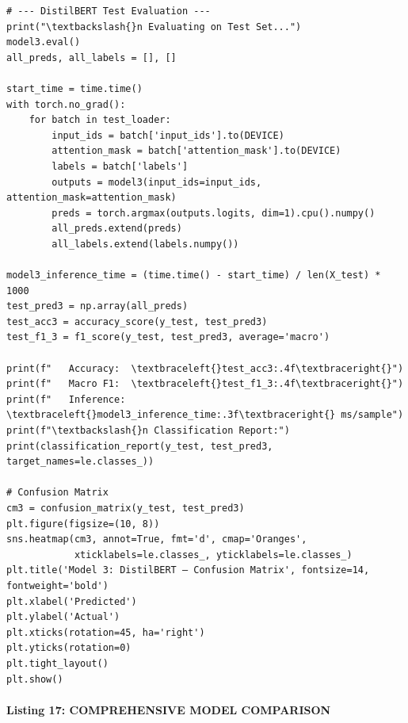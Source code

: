 \documentclass[12pt,a4paper,oneside]{report}
\begin{document}
\begin{Verbatim}[commandchars=\\\{\},breaklines=true,breakanywhere=true,fontsize=\scriptsize,frame=leftline,framesep=2mm,rulecolor=\color{gray}]
# --- DistilBERT Test Evaluation ---
print("\textbackslash{}n Evaluating on Test Set...")
model3.eval()
all_preds, all_labels = [], []

start_time = time.time()
with torch.no_grad():
    for batch in test_loader:
        input_ids = batch['input_ids'].to(DEVICE)
        attention_mask = batch['attention_mask'].to(DEVICE)
        labels = batch['labels']
        outputs = model3(input_ids=input_ids, attention_mask=attention_mask)
        preds = torch.argmax(outputs.logits, dim=1).cpu().numpy()
        all_preds.extend(preds)
        all_labels.extend(labels.numpy())

model3_inference_time = (time.time() - start_time) / len(X_test) * 1000
test_pred3 = np.array(all_preds)
test_acc3 = accuracy_score(y_test, test_pred3)
test_f1_3 = f1_score(y_test, test_pred3, average='macro')

print(f"   Accuracy:  \textbraceleft{}test_acc3:.4f\textbraceright{}")
print(f"   Macro F1:  \textbraceleft{}test_f1_3:.4f\textbraceright{}")
print(f"   Inference:  \textbraceleft{}model3_inference_time:.3f\textbraceright{} ms/sample")
print(f"\textbackslash{}n Classification Report:")
print(classification_report(y_test, test_pred3, target_names=le.classes_))

# Confusion Matrix
cm3 = confusion_matrix(y_test, test_pred3)
plt.figure(figsize=(10, 8))
sns.heatmap(cm3, annot=True, fmt='d', cmap='Oranges',
            xticklabels=le.classes_, yticklabels=le.classes_)
plt.title('Model 3: DistilBERT — Confusion Matrix', fontsize=14, fontweight='bold')
plt.xlabel('Predicted')
plt.ylabel('Actual')
plt.xticks(rotation=45, ha='right')
plt.yticks(rotation=0)
plt.tight_layout()
plt.show()
\end{Verbatim}
\paragraph{Listing 17: COMPREHENSIVE MODEL COMPARISON}\mbox{}\\[-1ex]
\end{document}
